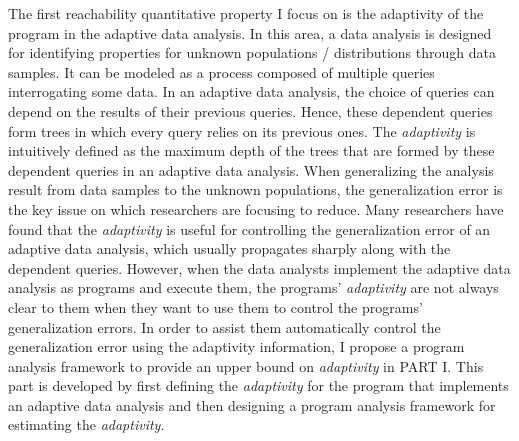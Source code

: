 The first reachability quantitative property
 I focus on is the adaptivity of the program in the adaptive data analysis.
 In this area, a data analysis is designed for identifying  properties for unknown populations / distributions 
 through data samples.
It can be modeled as a process composed of 
multiple queries interrogating some data.
 In an adaptive data analysis, the choice of queries can depend on the results of their previous queries. 
 Hence, these dependent queries form trees in which every query relies on its previous ones.
The \emph{adaptivity} is intuitively defined as the maximum depth of the trees that are formed by these dependent queries
in an adaptive data analysis.
When generalizing the analysis result from data samples to the unknown populations, 
the generalization error is the key issue on which researchers are focusing to reduce.
 Many researchers have found that the
 \emph{adaptivity} is useful for controlling the generalization error of an adaptive data analysis,
 which usually propagates sharply along with the dependent queries. 
 However, when the data analysts implement the adaptive
 data analysis as programs and execute them,
the programs' \emph{adaptivity} are not always clear to them
when they want to use them to control the programs' generalization errors.
In order to assist them automatically control the generalization error using the adaptivity information,
 I propose a program analysis framework
 to provide an upper bound on \emph{adaptivity}
in PART I.
This part is developed by first defining the \emph{adaptivity} for 
 the program that implements an adaptive data analysis
 and then designing
 a program analysis framework for estimating the \emph{adaptivity}.


